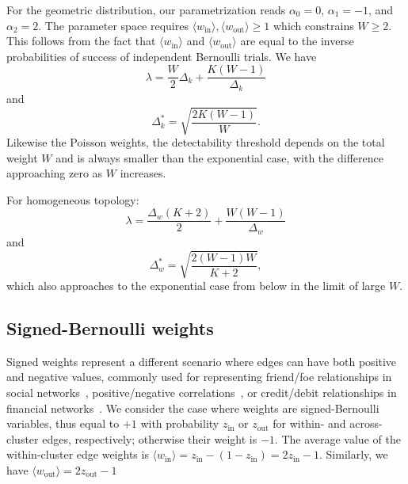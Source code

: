 \documentclass[a4paper,pre,superscriptaddress,floatfix,nofootinbib,twocolumn]{revtex4-1}
\begin{document}
For the geometric distribution,
our parametrization reads
$\alpha_0 = 0$, $\alpha_1 = -1$, and $\alpha_2 = 2$.
The parameter space requires
$\langle w_{\text{in}} \rangle, \langle w_{\text{out}} \rangle \geq 1$
which constrains $W \geq 2$.
This follows from the fact that $\langle w_{\text{in}} \rangle$ and $ \langle w_{\text{out}} \rangle$ are equal to the inverse probabilities of success of independent Bernoulli trials.
We have
\begin{equation}
\lambda = \frac{W}{2} \Delta_k + \frac{K(W-1)}{\Delta_k}
\label{eq:lambda_geometric}
\end{equation}
and
\begin{equation}
\Delta_k^* = \sqrt{\frac{2K(W - 1)}{W}}.
\label{eq:geometric_det}
\end{equation}
Likewise the Poisson weights, the detectability threshold depends on the total weight $W$ and is always smaller than the exponential case, with the difference approaching zero as $W$ increases.

For homogeneous topology:
\begin{equation}
\lambda = \frac{\Delta_w (K+2)}{2} + \frac{W(W-1)}{\Delta_w}
\label{eq:lambda_geometric_w}
\end{equation}
and
\begin{equation}
\Delta_{w}^* = \sqrt{\frac{2(W - 1)W}{K+2}},
\label{eq:geometric_w_det}
\end{equation}
which also approaches to the exponential case from below in the limit of large $W$.



\subsection*{Signed-Bernoulli weights}

Signed weights represent a different scenario where edges can have both positive and negative values, commonly used for representing friend/foe relationships in social networks~\cite{altafini2012dynamics,facchetti2011computing}, positive/negative correlations~\cite{tian2024spreading,sporns2016modular}, or credit/debit relationships in financial networks~\cite{ferreira2021loss}. We consider the case where weights are signed-Bernoulli
variables, thus equal to $+1$ with probability $z_\text{in}$ or $z_\text{out}$ for within- and across-cluster edges, respectively;
otherwise their weight is $-1$. The average value of the within-cluster edge weights is
$\langle w_\text{in} \rangle = z_\text{in} - (1 - z_\text{in}) = 2 z_\text{in} - 1$. Similarly, we have
$\langle w_\text{out} \rangle = 2 z_\text{out} - 1$
\end{document}
